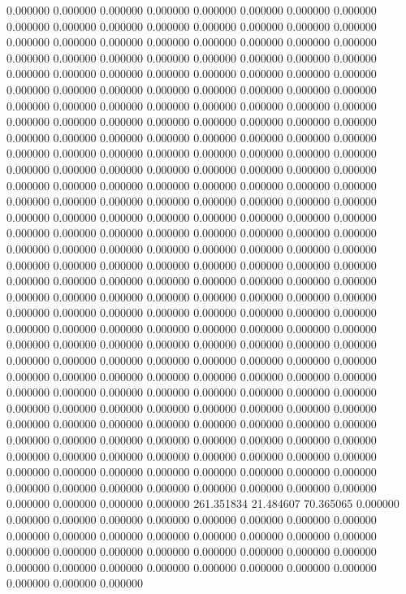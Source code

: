 0.000000 0.000000 0.000000
0.000000 0.000000 0.000000
0.000000 0.000000 0.000000
0.000000 0.000000 0.000000
0.000000 0.000000 0.000000
0.000000 0.000000 0.000000
0.000000 0.000000 0.000000
0.000000 0.000000 0.000000
0.000000 0.000000 0.000000
0.000000 0.000000 0.000000
0.000000 0.000000 0.000000
0.000000 0.000000 0.000000
0.000000 0.000000 0.000000
0.000000 0.000000 0.000000
0.000000 0.000000 0.000000
0.000000 0.000000 0.000000
0.000000 0.000000 0.000000
0.000000 0.000000 0.000000
0.000000 0.000000 0.000000
0.000000 0.000000 0.000000
0.000000 0.000000 0.000000
0.000000 0.000000 0.000000
0.000000 0.000000 0.000000
0.000000 0.000000 0.000000
0.000000 0.000000 0.000000
0.000000 0.000000 0.000000
0.000000 0.000000 0.000000
0.000000 0.000000 0.000000
0.000000 0.000000 0.000000
0.000000 0.000000 0.000000
0.000000 0.000000 0.000000
0.000000 0.000000 0.000000
0.000000 0.000000 0.000000
0.000000 0.000000 0.000000
0.000000 0.000000 0.000000
0.000000 0.000000 0.000000
0.000000 0.000000 0.000000
0.000000 0.000000 0.000000
0.000000 0.000000 0.000000
0.000000 0.000000 0.000000
0.000000 0.000000 0.000000
0.000000 0.000000 0.000000
0.000000 0.000000 0.000000
0.000000 0.000000 0.000000
0.000000 0.000000 0.000000
0.000000 0.000000 0.000000
0.000000 0.000000 0.000000
0.000000 0.000000 0.000000
0.000000 0.000000 0.000000
0.000000 0.000000 0.000000
0.000000 0.000000 0.000000
0.000000 0.000000 0.000000
0.000000 0.000000 0.000000
0.000000 0.000000 0.000000
0.000000 0.000000 0.000000
0.000000 0.000000 0.000000
0.000000 0.000000 0.000000
0.000000 0.000000 0.000000
0.000000 0.000000 0.000000
0.000000 0.000000 0.000000
0.000000 0.000000 0.000000
0.000000 0.000000 0.000000
0.000000 0.000000 0.000000
0.000000 0.000000 0.000000
0.000000 0.000000 0.000000
0.000000 0.000000 0.000000
0.000000 0.000000 0.000000
0.000000 0.000000 0.000000
0.000000 0.000000 0.000000
0.000000 0.000000 0.000000
0.000000 0.000000 0.000000
0.000000 0.000000 0.000000
0.000000 0.000000 0.000000
0.000000 0.000000 0.000000
0.000000 0.000000 0.000000
0.000000 0.000000 0.000000
0.000000 0.000000 0.000000
0.000000 0.000000 0.000000
0.000000 0.000000 0.000000
0.000000 0.000000 0.000000
0.000000 0.000000 0.000000
0.000000 0.000000 0.000000
0.000000 0.000000 0.000000
0.000000 0.000000 0.000000
261.351834 21.484607 70.365065
0.000000 0.000000 0.000000
0.000000 0.000000 0.000000
0.000000 0.000000 0.000000
0.000000 0.000000 0.000000
0.000000 0.000000 0.000000
0.000000 0.000000 0.000000
0.000000 0.000000 0.000000
0.000000 0.000000 0.000000
0.000000 0.000000 0.000000
0.000000 0.000000 0.000000
0.000000 0.000000 0.000000
0.000000 0.000000 0.000000

